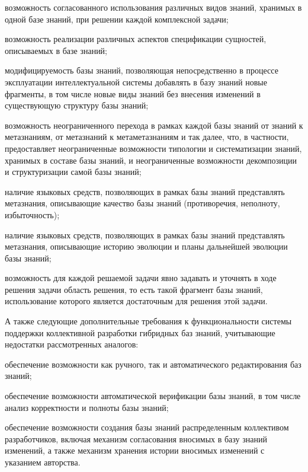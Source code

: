 \begin{textitemize}
\item возможность согласованного использования различных видов знаний, хранимых в одной базе знаний, при решении каждой комплексной задачи;

\item возможность реализации различных аспектов спецификации сущностей, описываемых в базе знаний;

\item модифицируемость базы знаний, позволяющая непосредственно в процессе эксплуатации интеллектуальной системы добавлять в базу знаний новые фрагменты, в том числе новые виды знаний без внесения изменений в существующую структуру базы знаний;

\item возможность неограниченного перехода в рамках каждой базы знаний от знаний к метазнаниям, от метазнаний к метаметазнаниям и так далее, что, в частности, предоставляет неограниченные возможности типологии и систематизации знаний, хранимых в составе базы знаний, и неограниченные возможности декомпозиции и структуризации самой базы знаний;

\item наличие языковых средств, позволяющих в рамках базы знаний представлять метазнания, описывающие качество базы знаний (противоречия, неполноту, избыточность);

\item наличие языковых средств, позволяющих в рамках базы знаний представлять метазнания, описывающие историю эволюции и планы дальнейшей эволюции базы знаний;

\item возможность для каждой решаемой задачи явно задавать и уточнять в ходе решения задачи область решения, то есть такой фрагмент базы знаний, использование которого является достаточным для решения этой задачи.
\end{textitemize}

А также следующие дополнительные требования к функциональности системы поддержки коллективной разработки гибридных баз знаний, учитывающие недостатки рассмотренных аналогов:

\begin{textitemize}
\item обеспечение возможности как ручного, так и автоматического редактирования баз знаний;

\item обеспечение возможности автоматической верификации базы знаний, в том числе анализ корректности и полноты базы знаний;

\item обеспечение возможности создания базы знаний распределенным коллективом разработчиков, включая механизм согласования вносимых в базу знаний изменений, а также механизм хранения истории вносимых изменений с указанием авторства.
\end{textitemize}

